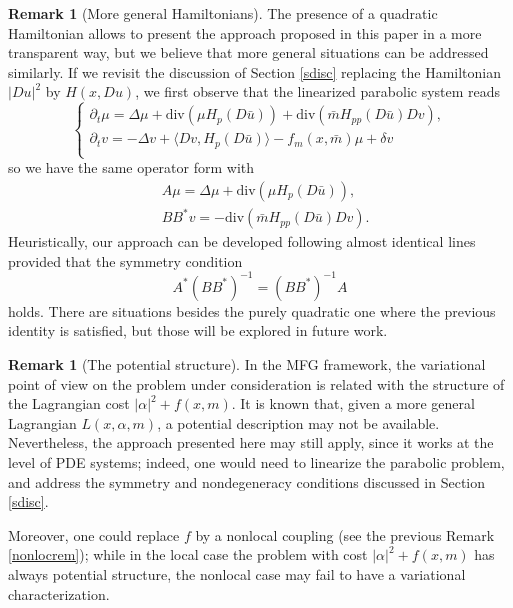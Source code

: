 \documentclass[10pt,a4paper,nouppercase,nowrite]{article}
\numberwithin{equation}{section}
\theoremstyle{definition}
\newtheorem{rmk}[defn]{Remark}
\begin{document}
	\begin{rmk}[More general Hamiltonians] The presence of a quadratic Hamiltonian allows to present the approach proposed in this paper in a more transparent way, but we believe that more general situations can be addressed similarly. If we revisit the discussion of Section \ref{sdisc} replacing the Hamiltonian $|Du|^2$ by $H(x,Du)$, we first observe that the linearized parabolic system reads
	\[
	\begin{cases}
			\partial_t \mu = \Delta \mu + \text{div}(\mu H_p(D \bar u)) + \text{div}(\bar m H_{pp}(D \bar u)Dv ) , \\
			\partial_t v = - \Delta v + \langle Dv,H_p(D \bar u) \rangle - f_m(x,\bar{m})\mu + \delta v \\
		\end{cases}
	\]
	so we have the same operator form with
	\begin{align*}
		& A \mu = \Delta \mu + \text{div}(\mu H_p(D \bar u)),\\
		& BB^{*} v = -\text{div}(\bar m H_{pp}(D \bar u)Dv).
	\end{align*}
	Heuristically, our approach can be developed following almost identical lines provided that the symmetry condition 
	\[
		A^{*} (BB^{*})^{-1} = (BB^{*})^{-1} A
	\]
	holds. There are situations besides the purely quadratic one where the previous identity is satisfied, but those will be explored in future work.
	
%	
	\end{rmk}
	
	\begin{rmk}[The potential structure] In the MFG framework, the variational point of view on the problem under consideration is related with the structure of the Lagrangian cost $|\alpha|^2 + f(x,m)$. It is known that, given a more general Lagrangian $L(x, \alpha, m)$, a potential description may not be available. Nevertheless, the approach presented here may still apply, since it works at the level of PDE systems; indeed, one would need to linearize the parabolic problem, and address the symmetry and nondegeneracy conditions discussed in Section \ref{sdisc}. 
	
	Moreover, one could replace $f$ by a nonlocal coupling (see the previous Remark \ref{nonlocrem}); while in the local case the problem  with cost $|\alpha|^2 + f(x,m)$ has always potential structure, the nonlocal case may fail to have a variational characterization.
	\end{rmk}
	
\end{document}
